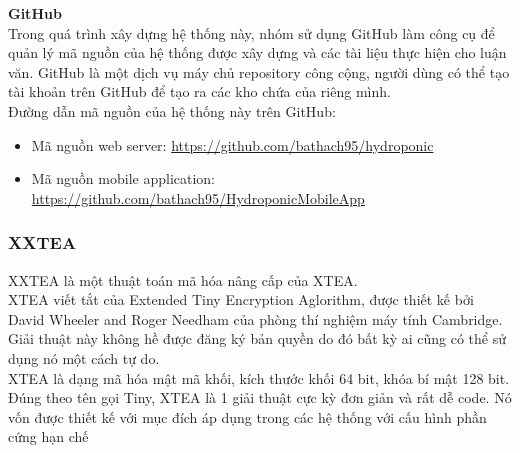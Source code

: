\documentclass[a4paper,12pt,oneside]{article}
\begin{document}
\noindent \textbf{GitHub}\\
Trong quá trình xây dựng hệ thống này, nhóm sử dụng GitHub làm công cụ để quản lý mã nguồn của hệ
thống được xây dựng và các tài liệu thực hiện cho luận văn. GitHub là một dịch vụ máy chủ
repository công cộng, người dùng có thể tạo tài khoản trên GitHub để tạo ra các kho chứa của riêng mình.\\
Đường dẫn mã nguồn của hệ thống này trên GitHub:
\begin{itemize}
\item Mã nguồn web server: \href{https://github.com/bathach95/hydroponic}{https://github.com/bathach95/hydroponic}
\item Mã nguồn mobile application: \href{https://github.com/bathach95/HydroponicMobileApp}{https://github.com/bathach95/HydroponicMobileApp}
\end{itemize}

\subsubsection{XXTEA}
\noindent XXTEA là một thuật toán mã hóa nâng cấp của XTEA.\\
\noindent XTEA viết tắt của Extended Tiny Encryption Aglorithm, được thiết kế bởi David Wheeler and Roger Needham của phòng thí nghiệm máy tính Cambridge. Giải thuật này không hề được đăng ký bản quyền do đó bất kỳ ai cũng có thể sử dụng nó một cách tự do. \\ 
\noindent XTEA là dạng mã hóa mật mã khối, kích thước khối 64 bit, khóa bí mật 128 bit. \\
\noindent Đúng theo tên gọi Tiny, XTEA là 1 giải thuật cực kỳ đơn giản và rất dễ code. Nó vốn được thiết kế với mục đích áp dụng trong các hệ thống với cấu hình phần cứng hạn chế 
\end{document}

